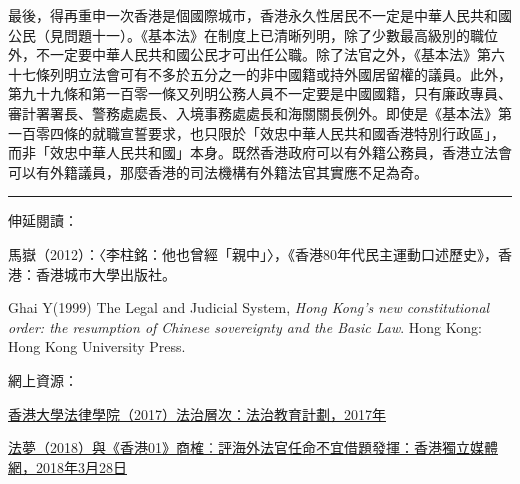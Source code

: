 最後，得再重申一次香港是個國際城市，香港永久性居民不一定是中華人民共和國公民（見問題十一）。《基本法》在制度上已清晰列明，除了少數最高級別的職位外，不一定要中華人民共和國公民才可出任公職。除了法官之外，《基本法》第六十七條列明立法會可有不多於五分之一的非中國籍或持外國居留權的議員。此外，第九十九條和第一百零一條又列明公務人員不一定要是中國國籍，只有廉政專員、審計署署長、警務處處長、入境事務處處長和海關關長例外。即使是《基本法》第一百零四條的就職宣誓要求，也只限於「效忠中華人民共和國香港特別行政區」，而非「效忠中華人民共和國」本身。既然香港政府可以有外籍公務員，香港立法會可以有外籍議員，那麼香港的司法機構有外籍法官其實應不足為奇。

\rule[-10pt]{15cm}{0.05em}

伸延閱讀：

馬嶽（2012）：〈李柱銘：他也曾經「親中」〉，《香港80年代民主運動口述歷史》，香港：香港城市大學出版社。

Ghai Y(1999) The Legal and Judicial System, \textit{Hong Kong's new constitutional order: the resumption of Chinese sovereignty and the Basic Law}. Hong Kong: Hong Kong University Press.

網上資源：

\href{http://www.role.hku.hk/levels}{香港大學法律學院（2017）法治層次：法治教育計劃，2017年}

\href{https://www.inmediahk.net/node/1056029}{法夢（2018）與《香港01》商榷︰評海外法官任命不宜借題發揮：香港獨立媒體網，2018年3月28日}